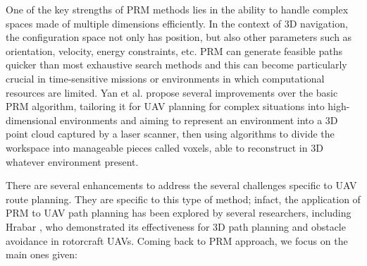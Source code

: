 \documentclass[conference]{IEEEtran}
\begin{document}
One of the key strengths of PRM methods lies in the ability to handle complex spaces made of multiple dimensions efficiently. In the context of 3D navigation, the configuration space not only has position, but also other parameters such as orientation, velocity, energy constraints, etc. PRM can generate feasible paths quicker than most exhaustive search methods and this can become particularly crucial in time-sensitive missions or environments in which computational resources are limited. Yan et al. \cite{paper3} propose several improvements over the basic PRM algorithm, tailoring it for UAV planning for complex situations into high-dimensional environments and aiming to represent an environment into a 3D point cloud captured by a laser scanner, then using algorithms to divide the workspace into manageable pieces called voxels, able to reconstruct in 3D whatever environment present. 

There are several enhancements to address the several challenges specific to UAV route planning. They are specific to this type of method; infact, the application of PRM to UAV path planning has been explored by several researchers, including Hrabar \cite{improveprm}, who demonstrated its effectiveness for 3D path planning and obstacle avoidance in rotorcraft UAVs. Coming back to PRM approach, we focus on the main ones given:
\end{document}
